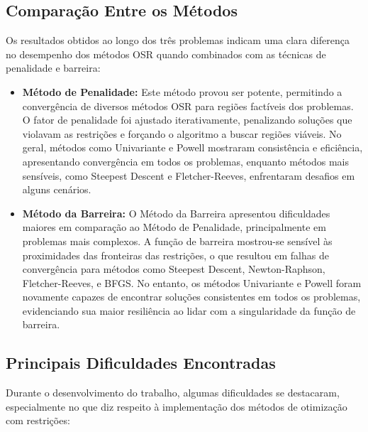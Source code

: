 \documentclass[a4paper, 12pt]{article}
\begin{document}
\subsection{Comparação Entre os Métodos}

Os resultados obtidos ao longo dos três problemas indicam uma clara diferença no desempenho dos métodos OSR quando combinados com as técnicas de penalidade e barreira:

\begin{itemize}
    \item \textbf{Método de Penalidade:} Este método provou ser potente, permitindo a convergência de diversos métodos OSR para regiões factíveis dos problemas. O fator de penalidade foi ajustado iterativamente, penalizando soluções que violavam as restrições e forçando o algoritmo a buscar regiões viáveis. No geral, métodos como Univariante e Powell mostraram consistência e eficiência, apresentando convergência em todos os problemas, enquanto métodos mais sensíveis, como Steepest Descent e Fletcher-Reeves, enfrentaram desafios em alguns cenários.

    \item \textbf{Método da Barreira:} O Método da Barreira apresentou dificuldades maiores em comparação ao Método de Penalidade, principalmente em problemas mais complexos. A função de barreira mostrou-se sensível às proximidades das fronteiras das restrições, o que resultou em falhas de convergência para métodos como Steepest Descent, Newton-Raphson, Fletcher-Reeves, e BFGS. No entanto, os métodos Univariante e Powell foram novamente capazes de encontrar soluções consistentes em todos os problemas, evidenciando sua maior resiliência ao lidar com a singularidade da função de barreira.

\end{itemize}

\subsection{Principais Dificuldades Encontradas}

Durante o desenvolvimento do trabalho, algumas dificuldades se destacaram, especialmente no que diz respeito à implementação dos métodos de otimização com restrições:
\end{document}
